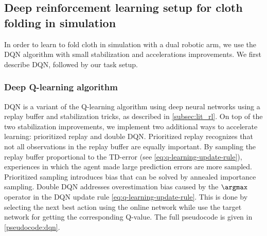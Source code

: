 \documentclass[\home/main.tex]{subfiles}
\begin{document}
\subsection{Deep reinforcement learning setup for cloth folding in simulation}
In order to learn to fold cloth in simulation with a dual robotic arm, we use the \gls{DQN} algorithm with small stabilization and accelerations improvements. We first describe DQN, followed by our task setup.

\subsubsection{Deep Q-learning algorithm}

\Gls{DQN} is a variant of the Q-learning algorithm \autocite{Watkins1992} using deep neural networks using a replay buffer and stabilization tricks, as described in \cref{subsec:lit_rl}. On top of the two stabilization improvements, we implement two additional ways to accelerate learning: prioritized replay and double DQN.
Prioritized replay \autocite{schaul2015prioritized} recognizes that not all observations in the replay buffer are equally important. By sampling the replay buffer proportional to the TD-error (see \cref{eq:q-learning-update-rule}), experiences in which the agent made large prediction errors are more sampled. Prioritized sampling introduces bias that can be solved by annealed importance sampling.
Double DQN \autocite{van2016deep} addresses overestimation bias caused by the $\argmax$ operator in the \gls{DQN} update rule \cref{eq:q-learning-update-rule}. This is done by selecting the next best action using the online network while use the target network for getting the corresponding Q-value.
The full pseudocode is given in \cref{pseudocode:dqn}.
\end{document}
